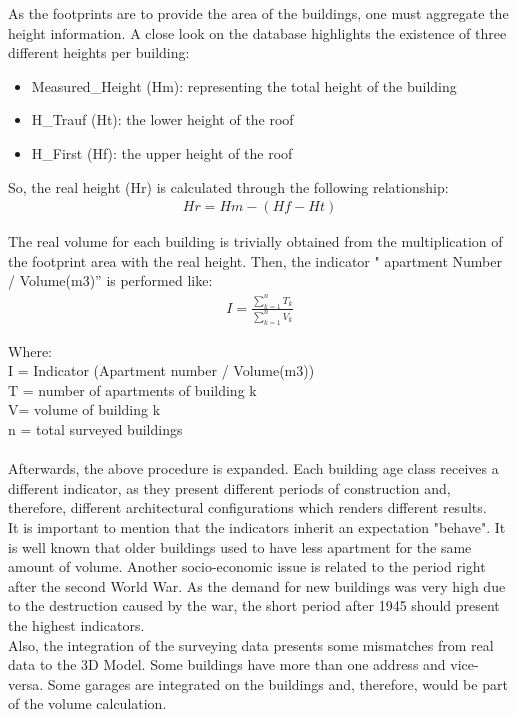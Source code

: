 \documentclass[11pt]{article}
\begin{document}
As the footprints are  to provide the area of the buildings, one must aggregate the height information. A close look on the database highlights the existence of three different heights per building:
\begin{itemize}
\item Measured\_Height (Hm): representing the total height of the building
\item H\_Trauf (Ht): the lower height of the roof
\item H\_First (Hf): the upper height of the roof
\end{itemize}

So, the real height (Hr) is calculated through the following relationship:
\begin{align}
Hr=Hm-(Hf-Ht)
\end{align}


The real volume for each building is trivially obtained from the multiplication of the footprint area with the real height. Then, the indicator " apartment Number / Volume(m3)” is performed like:\\
\begin{align}
I = \frac {\sum\limits_{k=1}^n T_{k}}{\sum\limits_{k=1}^n V_{k}}
\end{align}


Where:\\
I = Indicator (Apartment number / Volume(m3))\\
T = number of apartments of building k\\
V= volume of building k\\
n = total surveyed buildings\\
\\
Afterwards, the above procedure is expanded. Each building age class receives a different indicator, as they present different periods of construction and, therefore, different architectural configurations which renders different results.\\

It is important to mention that the indicators inherit an expectation "behave". It is well known that older buildings used to have less apartment for the same amount of volume. Another socio-economic issue is related to the period right after the second World War. As the demand for new buildings was very high due to the destruction caused by the war, the short period after 1945 should present the highest indicators. \\

Also, the integration of the surveying data presents some mismatches from real data to the 3D Model. Some buildings have more than one address and vice-versa. Some garages are integrated on the buildings and, therefore, would be part of the volume calculation.\\
\end{document}
